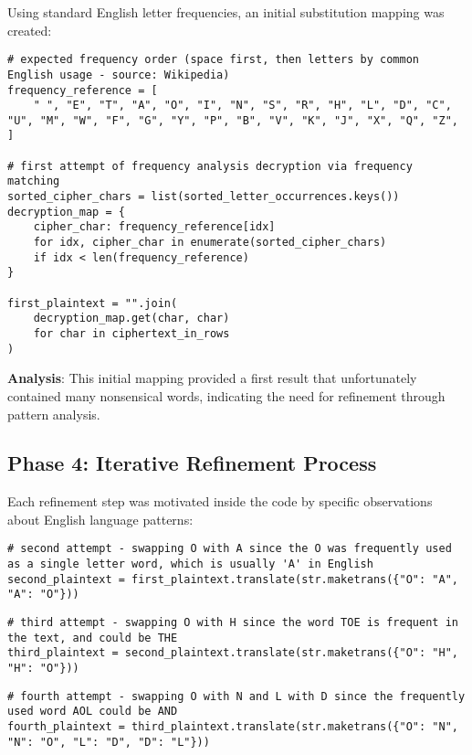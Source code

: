 \documentclass[12pt,a4paper]{article}
\begin{document}
Using standard English letter frequencies, an initial substitution mapping was created:

\begin{lstlisting}[caption=Initial Frequency-Based Mapping]
# expected frequency order (space first, then letters by common English usage - source: Wikipedia)
frequency_reference = [
    " ", "E", "T", "A", "O", "I", "N", "S", "R", "H", "L", "D", "C", "U", "M", "W", "F", "G", "Y", "P", "B", "V", "K", "J", "X", "Q", "Z",
]

# first attempt of frequency analysis decryption via frequency matching
sorted_cipher_chars = list(sorted_letter_occurrences.keys())
decryption_map = {
    cipher_char: frequency_reference[idx]
    for idx, cipher_char in enumerate(sorted_cipher_chars)
    if idx < len(frequency_reference)
}

first_plaintext = "".join(
    decryption_map.get(char, char)
    for char in ciphertext_in_rows  
)
\end{lstlisting}

\textbf{Analysis}: This initial mapping provided a first result that unfortunately contained many nonsensical words, indicating the need for refinement through pattern analysis.

\subsection{Phase 4: Iterative Refinement Process}

Each refinement step was motivated inside the code by specific observations about English language patterns:

\begin{lstlisting}[caption=First Manual Adjustment]
# second attempt - swapping O with A since the O was frequently used as a single letter word, which is usually 'A' in English
second_plaintext = first_plaintext.translate(str.maketrans({"O": "A", "A": "O"}))
\end{lstlisting}

\begin{lstlisting}[caption=THE Pattern Recognition]
# third attempt - swapping O with H since the word TOE is frequent in the text, and could be THE 
third_plaintext = second_plaintext.translate(str.maketrans({"O": "H", "H": "O"}))
\end{lstlisting}

\begin{lstlisting}[caption=AND Pattern Recognition]
# fourth attempt - swapping O with N and L with D since the frequently used word AOL could be AND
fourth_plaintext = third_plaintext.translate(str.maketrans({"O": "N", "N": "O", "L": "D", "D": "L"}))
\end{lstlisting}
\end{document}
